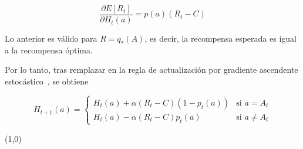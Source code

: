 \documentclass[12pt]{article}
\begin{document}
    \[
        \frac{\partial E[R_t]}{\partial H_t(a)} = p(a)(R_t - C)
    \]

    Lo anterior es válido para $R=q_{*}(A)$, es decir, la recompensa esperada es igual a la recompensa óptima.

    Por lo tanto, tras remplazar en la regla de actualización por gradiente ascendente estocástico~\cite{Sutton2018}, se obtiene

    \[
        H_{t+1}(a) =
        \begin{cases}
            H_t (a) + \alpha (R_t - C)(1-p_t(a))    &\text{si $a = A_t$} \\
            H_t (a) - \alpha (R_t - C)p_t(a)        &\text{si $a \neq A_t$}
        \end{cases}
    \]


    \line(1,0){\textwidth}

    
\end{document}
